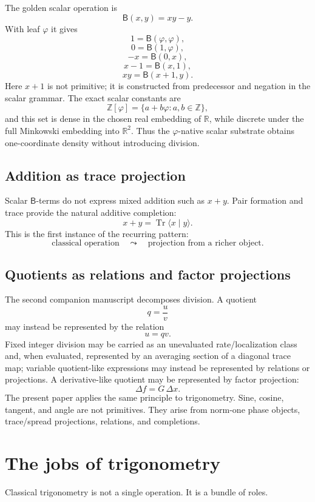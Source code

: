 \documentclass[11pt]{article}
\newcommand{\B}{\mathsf{B}}
\newcommand{\Tr}{\operatorname{Tr}}
\newcommand{\ph}{\varphi}
\newcommand{\Z}{\mathbb{Z}}
\newcommand{\R}{\mathbb{R}}
\begin{document}
The golden scalar operation is
\[
    \B(x,y)=xy-y.
\]
With leaf $\ph$ it gives
\[
    1=\B(\ph,\ph),
\]
\[
    0=\B(1,\ph),
\]
\[
    -x=\B(0,x),
\]
\[
    x-1=\B(x,1),
\]
\[
    xy=\B(x+1,y).
\]
Here $x+1$ is not primitive; it is constructed from predecessor and negation in the scalar grammar.  The exact scalar constants are
\[
    \Z[\ph]=\{a+b\ph:a,b\in\Z\},
\]
and this set is dense in the chosen real embedding of $\R$, while discrete under the full Minkowski embedding into $\R^2$.  Thus the $\ph$-native scalar substrate obtains one-coordinate density without introducing division.

\subsection{Addition as trace projection}

Scalar $\B$-terms do not express mixed addition such as $x+y$.  Pair formation and trace provide the natural additive completion:
\[
    x+y=\Tr\langle x\mid y\rangle.
\]
This is the first instance of the recurring pattern:
\[
    \text{classical operation} \quad\leadsto\quad \text{projection from a richer object}.
\]

\subsection{Quotients as relations and factor projections}

The second companion manuscript decomposes division.  A quotient
\[
    q=\frac uv
\]
may instead be represented by the relation
\[
    u=qv.
\]
Fixed integer division may be carried as an unevaluated rate/localization class and, when evaluated, represented by an averaging section of a diagonal trace map; variable quotient-like expressions may instead be represented by relations or projections.  A derivative-like quotient may be represented by factor projection:
\[
    \Delta f=G\,\Delta x.
\]
The present paper applies the same principle to trigonometry.  Sine, cosine, tangent, and angle are not primitives.  They arise from norm-one phase objects, trace/spread projections, relations, and completions.

\section{The jobs of trigonometry}

Classical trigonometry is not a single operation.  It is a bundle of roles.
\end{document}
